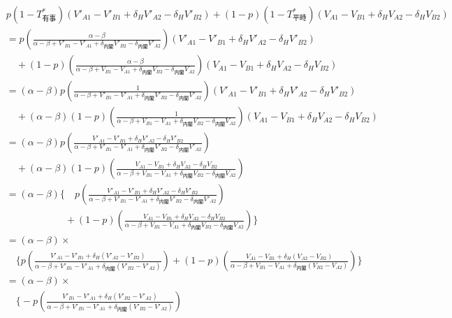 \documentclass[main.tex]{subfiles}
\begin{document}
\begin{align*}
    &p(1-T^*_{有事}) (V'_{A1} -V'_{B1} + \delta_H V'_{A2} - \delta_H V'_{B2})    +    (1-p)(1-T^*_{平時})(V_{A1} - V_{B1} + \delta_H V_{A2} - \delta_H V_{B2} ) \\[1em]
    &= p( \frac{ \alpha-\beta }{ \alpha-\beta + V'_{B1}-V'_{A1} + \delta_{内閣}V'_{B2} - \delta_{内閣}V'_{A2} } ) (V'_{A1} -V'_{B1} + \delta_H V'_{A2} - \delta_H V'_{B2})  \\
    &\quad    +    (1-p)(  \frac{ \alpha-\beta }{ \alpha-\beta + V_{B1}-V_{A1} + \delta_{内閣}V_{B2} - \delta_{内閣}V_{A2} } )(V_{A1} - V_{B1} + \delta_H V_{A2} - \delta_H V_{B2} ) \\[1em]
    &= (\alpha - \beta) p( \frac{ 1 }{ \alpha-\beta + V'_{B1}-V'_{A1} + \delta_{内閣}V'_{B2} - \delta_{内閣}V'_{A2} } ) (V'_{A1} -V'_{B1} + \delta_H V'_{A2} - \delta_H V'_{B2})  \\
    &\quad    +     (\alpha - \beta)(1-p)(  \frac{ 1 }{ \alpha-\beta + V_{B1}-V_{A1} + \delta_{内閣}V_{B2} - \delta_{内閣}V_{A2} } )(V_{A1} - V_{B1} + \delta_H V_{A2} - \delta_H V_{B2} ) \\[1em]
    &= (\alpha - \beta) p( \frac{ V'_{A1} -V'_{B1} + \delta_H V'_{A2} - \delta_H V'_{B2} }{ \alpha-\beta + V'_{B1}-V'_{A1} + \delta_{内閣}V'_{B2} - \delta_{内閣}V'_{A2} } )  \\[0.5em]
    &\quad    +     (\alpha - \beta)(1-p)(  \frac{ V_{A1} - V_{B1} + \delta_H V_{A2} - \delta_H V_{B2}  }{ \alpha-\beta + V_{B1}-V_{A1} + \delta_{内閣}V_{B2} - \delta_{内閣}V_{A2} } )\\[1em]
    &= (\alpha - \beta) \Big\{ \quad p( \frac{ V'_{A1} -V'_{B1} + \delta_H V'_{A2} - \delta_H V'_{B2} }{ \alpha-\beta + V'_{B1}-V'_{A1} + \delta_{内閣}V'_{B2} - \delta_{内閣}V'_{A2} } )  \\[0.5em]
    &\quad\quad\quad\quad\quad\quad    +     (1-p)(  \frac{ V_{A1} - V_{B1} + \delta_H V_{A2} - \delta_H V_{B2}  }{ \alpha-\beta + V_{B1}-V_{A1} + \delta_{内閣}V_{B2} - \delta_{内閣}V_{A2} } )\Big\}\\[1em]
    &= (\alpha - \beta)×\\
    &\quad \Big\{  p( \frac{ V'_{A1} -V'_{B1} + \delta_H (V'_{A2} - V'_{B2}) }{ \alpha-\beta + V'_{B1}-V'_{A1} + \delta_{内閣}(V'_{B2} - V'_{A2}) } )  
                    +(1-p)(  \frac{ V_{A1} - V_{B1} + \delta_H (V_{A2} - V_{B2})  }{ \alpha-\beta + V_{B1}-V_{A1} + \delta_{内閣}(V_{B2} - V_{A2}) } )\Big\}\\[1em]
    &= (\alpha - \beta)×\\
    &\quad \Big\{  -p( \frac{  V'_{B1} - V'_{A1} + \delta_H (V'_{B2} - V'_{A2}) }{ \alpha-\beta + V'_{B1}-V'_{A1} + \delta_{内閣}(V'_{B2} - V'_{A2}) } )  

\end{align*}
\end{document}
